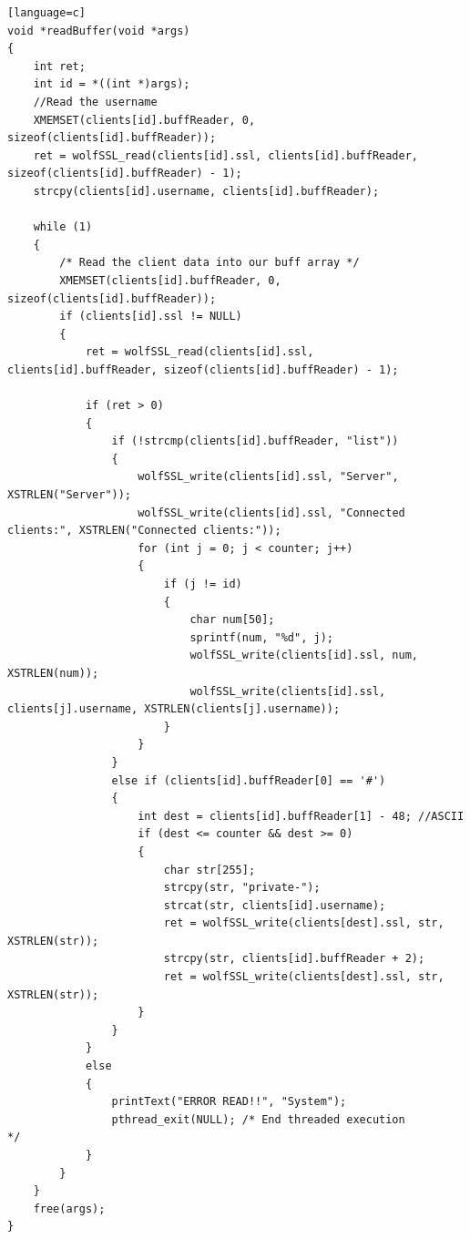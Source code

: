 \documentclass[a4paper,12pt]{article}
\begin{document}
\begin{lstlisting}[caption={void *readBuffer(void *args) of TLS server},captionpos=b][language=c]
void *readBuffer(void *args)
{
    int ret;
    int id = *((int *)args);
    //Read the username
    XMEMSET(clients[id].buffReader, 0, sizeof(clients[id].buffReader));
    ret = wolfSSL_read(clients[id].ssl, clients[id].buffReader, sizeof(clients[id].buffReader) - 1);
    strcpy(clients[id].username, clients[id].buffReader);

    while (1)
    {
        /* Read the client data into our buff array */
        XMEMSET(clients[id].buffReader, 0, sizeof(clients[id].buffReader));
        if (clients[id].ssl != NULL)
        {
            ret = wolfSSL_read(clients[id].ssl, clients[id].buffReader, sizeof(clients[id].buffReader) - 1);

            if (ret > 0)
            {
                if (!strcmp(clients[id].buffReader, "list"))
                {
                    wolfSSL_write(clients[id].ssl, "Server", XSTRLEN("Server"));
                    wolfSSL_write(clients[id].ssl, "Connected clients:", XSTRLEN("Connected clients:"));
                    for (int j = 0; j < counter; j++)
                    {
                        if (j != id)
                        {
                            char num[50];
                            sprintf(num, "%d", j);
                            wolfSSL_write(clients[id].ssl, num, XSTRLEN(num));
                            wolfSSL_write(clients[id].ssl, clients[j].username, XSTRLEN(clients[j].username));
                        }
                    }
                }
                else if (clients[id].buffReader[0] == '#')
                {
                    int dest = clients[id].buffReader[1] - 48; //ASCII
                    if (dest <= counter && dest >= 0)
                    {
                        char str[255];
                        strcpy(str, "private-");
                        strcat(str, clients[id].username);
                        ret = wolfSSL_write(clients[dest].ssl, str, XSTRLEN(str));
                        strcpy(str, clients[id].buffReader + 2);
                        ret = wolfSSL_write(clients[dest].ssl, str, XSTRLEN(str));
                    }
                }
            }
            else
            {
                printText("ERROR READ!!", "System");
                pthread_exit(NULL); /* End threaded execution                */
            }
        }
    }
    free(args);
}
\end{lstlisting}
\end{document}
